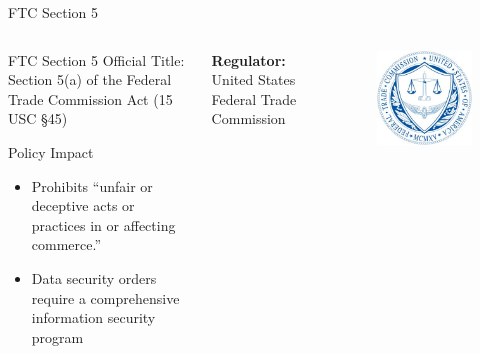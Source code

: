 \documentclass[10pt]{beamer}
\begin{document}
\begin{frame}{FTC Section 5}
  \begin{columns}

      \begin{exampleblock}{FTC Section 5}
        Official Title: Section 5(a) of the Federal Trade Commission Act (15 USC §45)
        \begin{center}Policy Impact\end{center}
        \begin{itemize}
        \item{Prohibits “unfair or deceptive  acts  or  practices  in  or  affecting commerce.”}
        \item{Data security orders require a comprehensive information security program}
        \end{itemize}
      \end{exampleblock}
    \textbf{Regulator:} United States Federal Trade Commission 
    \begin{figure}
	\includegraphics[width=\textwidth]{Figures/FTC.jpg}
    \end{figure}    
    \end{columns}
\end{frame}
\end{document}
